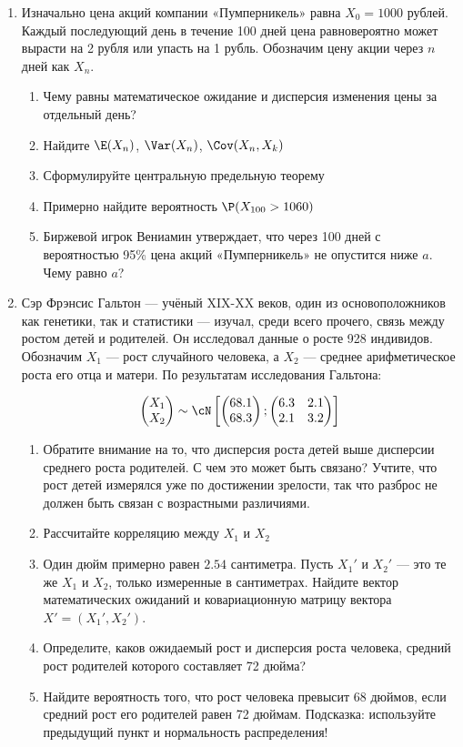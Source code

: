 \begin{enumerate}
\item Изначально цена акций компании «Пумперникель» равна $X_0=1000$ рублей. Каждый последующий день в течение 100 дней цена равновероятно может вырасти на 2 рубля или упасть на 1 рубль. Обозначим цену акции через $n$ дней как $X_n$.
\begin{enumerate}
\item Чему равны математическое ожидание и дисперсия изменения цены за отдельный день?
\item Найдите $\E(X_n)$, $\Var(X_n)$, $\Cov(X_n, X_k)$
\item Сформулируйте центральную предельную теорему
\item Примерно найдите вероятность $\P(X_{100}>1060)$
\item Биржевой игрок Вениамин утверждает, что через 100 дней с вероятностью 95\% цена акций «Пумперникель» не опустится ниже $a$. Чему равно $a$?
\end{enumerate}
\item  Сэр Фрэнсис Гальтон —  учёный XIX-XX веков, один из основоположников как
генетики, так и статистики — изучал, среди всего прочего, связь между ростом детей и родителей.  Он исследовал данные о росте 928 индивидов. Обозначим $X_1$ — рост случайного человека, а $X_2$ — среднее арифметическое роста его отца и матери. По результатам исследования Гальтона:


\[
\begin{pmatrix}
X_1 \\
X_2
\end{pmatrix}
\sim
\cN\left[
\begin{pmatrix}
68.1 \\
68.3
\end{pmatrix};
\begin{pmatrix}
6.3 & 2.1 \\
2.1 & 3.2
\end{pmatrix}
\right]
\]

\begin{enumerate}
\item Обратите внимание на то, что дисперсия роста детей выше дисперсии среднего роста
родителей. С чем это
может быть связано? Учтите, что рост детей измерялся уже по достижении
зрелости, так что разброс не должен быть связан с возрастными различиями.
\item Рассчитайте корреляцию между $X_1$ и $X_2$
\item Один дюйм примерно равен $2.54$ сантиметра. Пусть $X_1'$ и $X_2'$ — это те же $X_1$ и $X_2$, только измеренные в сантиметрах. Найдите вектор математических ожиданий и ковариационную матрицу вектора $X'=(X_1', X_2')$.
\item Определите, каков ожидаемый рост и дисперсия роста человека, средний рост родителей которого составляет 72 дюйма?
\item Найдите вероятность того, что рост человека превысит 68 дюймов, если средний рост его родителей равен 72 дюймам. Подсказка: используйте предыдущий пункт и нормальность распределения!
\end{enumerate}


\end{enumerate}
